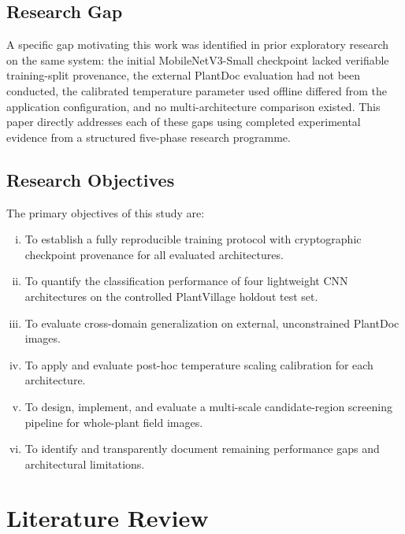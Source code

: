 \documentclass[pdflatex,sn-mathphys-num]{sn-jnl}
\theoremstyle{thmstyleone}%
\theoremstyle{thmstyletwo}%
\theoremstyle{thmstylethree}%
\begin{document}
\subsection{Research Gap}
\label{sec:research_gap}

A specific gap motivating this work was identified in prior exploratory research on the
same system: the initial MobileNetV3-Small checkpoint lacked verifiable training-split
provenance, the external PlantDoc evaluation had not been conducted, the calibrated
temperature parameter used offline differed from the application configuration, and no
multi-architecture comparison existed. This paper directly addresses each of these gaps
using completed experimental evidence from a structured five-phase research programme.

\subsection{Research Objectives}
\label{sec:objectives}

The primary objectives of this study are:
\begin{enumerate}[(i)]
  \item To establish a fully reproducible training protocol with cryptographic checkpoint
        provenance for all evaluated architectures.
  \item To quantify the classification performance of four lightweight CNN architectures
        on the controlled PlantVillage holdout test set.
  \item To evaluate cross-domain generalization on external, unconstrained PlantDoc images.
  \item To apply and evaluate post-hoc temperature scaling calibration for each architecture.
  \item To design, implement, and evaluate a multi-scale candidate-region screening
        pipeline for whole-plant field images.
  \item To identify and transparently document remaining performance gaps and
        architectural limitations.
\end{enumerate}


\section{Literature Review}
\label{sec:literature_review}
\end{document}
